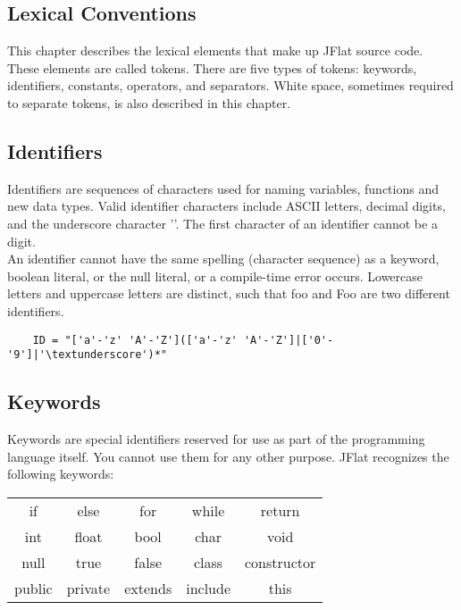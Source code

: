 \begin{homeworkProblem}
	\chapter{Lexical Conventions}
	This chapter describes the lexical elements that make up JFlat source code. These elements are called tokens. There are five types of tokens: keywords, identifiers, constants, operators, and separators. White space, sometimes required to separate tokens, is also described in this chapter.
	
	\section{Identifiers}
	Identifiers are sequences of characters used for naming variables, functions and new data types. Valid identifier characters include ASCII letters, decimal digits, and the underscore character '\textunderscore'. The first character of an identifier cannot be a digit.\\
	An identifier cannot have the same spelling (character sequence) as a keyword, boolean literal, or the null literal, or a compile-time error occurs. Lowercase letters and uppercase letters are distinct, such that foo and Foo are two different identifiers.
	
	\begin{verbatim}
	ID = "['a'-'z' 'A'-'Z'](['a'-'z' 'A'-'Z']|['0'-'9']|'\textunderscore')*"
	\end{verbatim}
	
	\section{Keywords}
	Keywords are special identifiers reserved for use as part of the programming language itself. You cannot use them for any other purpose. JFlat recognizes the following keywords:
	
	\begin{center}
		\begin{tabular}{ccccc}
		if & else & for & while & return \\
		int & float & bool & char & void \\
		null & true & false & class & constructor \\
		public & private & extends & include & this \\
		\end{tabular}
	\end{center}


\end{homeworkProblem}
